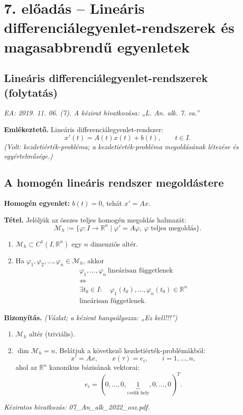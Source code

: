 \graphicspath{{lectures/07_eloadas_abrak/}}

\section{7. előadás -- Lineáris differenciálegyenlet-rendszerek és magasabbrendű egyenletek}

\subsection{Lineáris differenciálegyenlet-rendszerek (folytatás)}
\textit{EA: 2019. 11. 06. (7). A kézirat hivatkozása: „L. An. alk. 7. ea.”}

\textbf{Emlékeztető.} Lineáris differenciálegyenlet-rendszer:
\[
 x'(t)=A(t)x(t)+b(t),\qquad t\in I.
\]
\textit{(Volt: kezdetiérték-probléma; a kezdetiérték-probléma megoldásának létezése és egyértelműsége.)}

\subsection{A homogén lineáris rendszer megoldástere}
\textbf{Homogén egyenlet:} $b(t)=0$, tehát $x'=Ax$.

\begin{matbox}
\textbf{Tétel.} Jelöljük az összes teljes homogén megoldás halmazát:
\[
 \mathcal M_h:=\{\varphi:I\to\mathbb R^n\mid
 \varphi'=A\varphi,\ \varphi\text{ teljes megoldás}\}.
\]
\begin{enumerate}[label=\arabic*)]
\item $\mathcal M_h\subset C^1(I,\mathbb R^n)$ egy $n$ dimenziós altér.
\item Ha $\varphi_1,\varphi_2,\ldots,\varphi_n\in\mathcal M_h$, akkor
\[
 \begin{gathered}
 \varphi_1,\ldots,\varphi_n\ \text{lineárisan függetlenek}\\
 \Longleftrightarrow\\
 \exists t_0\in I:\quad \varphi_1(t_0),\ldots,\varphi_n(t_0)\in\mathbb R^n\\
 \text{lineárisan függetlenek.}
 \end{gathered}
\]
\end{enumerate}
\end{matbox}

\textbf{Bizonyítás.} \textit{(Vázlat; a kézirat hangsúlyozza: „Ez kell!!!”)}
\begin{enumerate}[label=\arabic*)]
\item $\mathcal M_h$ altér (triviális).
\item $\dim\mathcal M_h=n$. Belátjuk a következő kezdetiérték-problémákból:
\[
 x'=Ax,\qquad x(\tau)=e_i,\qquad i=1,\ldots,n,
\]
ahol az $\mathbb R^n$ kanonikus bázisának vektorai:
\[
 e_i=(0,\ldots,0,\underbrace{1}_{i\text{-edik hely}},0,\ldots,0)^T.
\]
\end{enumerate}
\textit{Kéziratos hivatkozás: 07\_An\_alk\_2022\_osz.pdf.}

